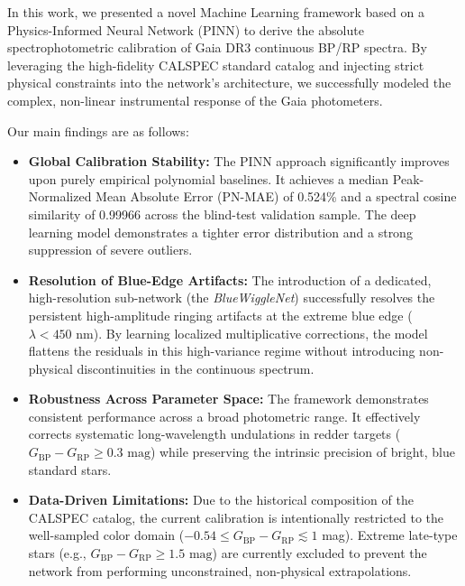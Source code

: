 \documentclass{aa}
\begin{document}
In this work, we presented a novel Machine Learning framework based on a Physics-Informed Neural Network (PINN) to derive the absolute spectrophotometric calibration of Gaia DR3 continuous BP/RP spectra. By leveraging the high-fidelity CALSPEC standard catalog and injecting strict physical constraints into the network's architecture, we successfully modeled the complex, non-linear instrumental response of the Gaia photometers. 

Our main findings are as follows:

\begin{itemize}[itemsep=0.25cm]
    \item \textbf{Global Calibration Stability:} The PINN approach significantly improves upon purely empirical polynomial baselines. It achieves a median Peak-Normalized Mean Absolute Error (PN-MAE) of 0.524\% and a spectral cosine similarity of 0.99966 across the blind-test validation sample. The deep learning model demonstrates a tighter error distribution and a strong suppression of severe outliers.
    
    \item \textbf{Resolution of Blue-Edge Artifacts:} The introduction of a dedicated, high-resolution sub-network (the \textit{BlueWiggleNet}) successfully resolves the persistent high-amplitude ringing artifacts at the extreme blue edge ($\lambda < 450\text{ nm}$). By learning localized multiplicative corrections, the model flattens the residuals in this high-variance regime without introducing non-physical discontinuities in the continuous spectrum.
    
    \item \textbf{Robustness Across Parameter Space:} The framework demonstrates consistent performance across a broad photometric range. It effectively corrects systematic long-wavelength undulations in redder targets ($G_{\text{BP}} - G_{\text{RP}} \ge 0.3\text{ mag}$) while preserving the intrinsic precision of bright, blue standard stars.
    
    \item \textbf{Data-Driven Limitations:} Due to the historical composition of the CALSPEC catalog, the current calibration is intentionally restricted to the well-sampled color domain ($-0.54 \leq G_{\text{BP}} - G_{\text{RP}} \lesssim 1$ mag). Extreme late-type stars (e.g., $G_{\text{BP}} - G_{\text{RP}} \ge 1.5\text{ mag}$) are currently excluded to prevent the network from performing unconstrained, non-physical extrapolations.
\end{itemize}
\end{document}
